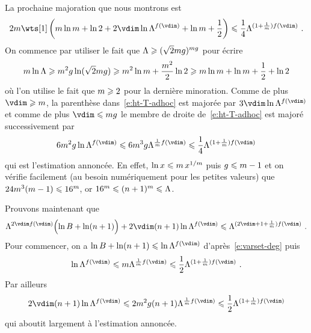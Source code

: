La prochaine majoration  que nous montrons est
\begin{equation} \label{e:ht-T-adhoc}
  2\puiss \wts[1] \left(
    \puiss \ln \puiss + \ln 2 + 2\vdim \ln \Lambda^{f(\vdim)}
    + \ln \puiss + \frac12
  \right)
  \le
  \frac14 \Lambda^{ (1 + \frac1\puiss) f(\vdim) }
  \pmm.
\end{equation}
On commence par utiliser le fait que \( \Lambda \geqslant (\sqrt2
  mg)^{mg} \) pour écrire
\begin{equation}
  m \ln \Lambda
  \geqslant
  m^2 g \ln( \sqrt2 m g )
  \geqslant
  m^2 \ln m + \frac{ m^2 }2 \ln 2
  \geqslant
  m \ln m + \ln m + \frac12 + \ln 2
\end{equation}
où l'on utilise le fait que \( m \geqslant 2 \) pour la dernière minoration.
Comme de plus \( \vdim \ge \puiss \), la parenthèse dans~\eqref{e:ht-T-adhoc}
est majorée par \( 3\vdim \ln \Lambda^{f(\vdim)} \) et comme de plus \( \vdim
  \le \puiss\genre \) le membre de droite de~\eqref{e:ht-T-adhoc} est majoré
successivement par
\begin{equation}
  6 \puiss^2 \genre \ln \Lambda^{f(\vdim)}
  \le
  6 \puiss^3 \genre \Lambda^{\frac1\puiss f(\vdim)}
  \le
  \frac14 \Lambda^{(1 + \frac1\puiss) f(\vdim)}
\end{equation}
qui est l'estimation annoncée. En effet, \( \ln x \leqslant m \, x^{1/m}
\) puis \( g \leqslant m - 1 \) et on vérifie facilement (au besoin
numériquement pour les petites valeurs) que \( 24 m^3 (m - 1) \leqslant
  16^{m} \), or \( 16^m \leqslant (n + 1)^m \leqslant \Lambda \).

Prouvons maintenant que
\begin{equation} \label{e:ht-T'-adhoc}
  \Lambda^{2\vdim f(\vdim)} \Bigl( \ln B + \ln(\dimp + 1) \Bigr)
  + 2\vdim (\dimp + 1) \ln \Lambda^{f(\vdim)}
  \le
  \Lambda^{(2\vdim + 1 + \frac1\puiss) f(\vdim)}
  \pmm.
\end{equation}
Pour commencer, on a \( \ln B + \ln(\dimp + 1) \le \ln \Lambda^{f(\vdim)} \)
d'après~\eqref{e:varset-deg} puis
\begin{equation}
  \ln \Lambda^{f(\vdim)}
  \le
  \puiss \Lambda^{\frac1\puiss f(\vdim)}
  \le
  \frac12 \Lambda^{(1 + \frac1\puiss) f(\vdim)}
  \pmm.
\end{equation}
Par ailleurs
\begin{equation}
  2 \vdim (\dimp + 1) \ln \Lambda^{f(\vdim)}
  \le
  2 \puiss^2 \genre (\dimp + 1) \Lambda^{\frac1\puiss f(\vdim)}
  \le
  \frac12 \Lambda^{(1 + \frac1\puiss) f(\vdim)}
\end{equation}
qui aboutit largement à l'estimation annoncée.




\endinput

